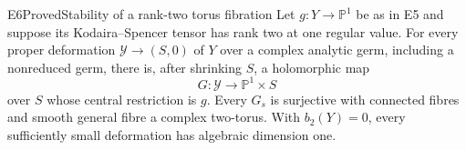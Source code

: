 \begin{statement}{E6}{Proved}{Stability of a rank-two torus fibration}
Let $g:Y\to\mathbb P^1$ be as in E5 and suppose its
Kodaira--Spencer tensor has rank two at one regular value. For every
proper deformation $\mathcal Y\to(S,0)$ of $Y$ over a complex
analytic germ, including a nonreduced germ, there is, after shrinking
$S$, a holomorphic map
\[
 G:\mathcal Y\longrightarrow\mathbb P^1\times S
\]
over $S$ whose central restriction is $g$. Every $G_s$ is surjective
with connected fibres and smooth general fibre a complex two-torus.
With $b_2(Y)=0$, every sufficiently small deformation has algebraic
dimension one.
\end{statement}
